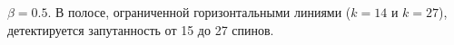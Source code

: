 $\beta=0.5$.
В полосе, ограниченной горизонтальными линиями ($k=14$ и $k=27$),
детектируется запутанность от 15 до 27 спинов.
